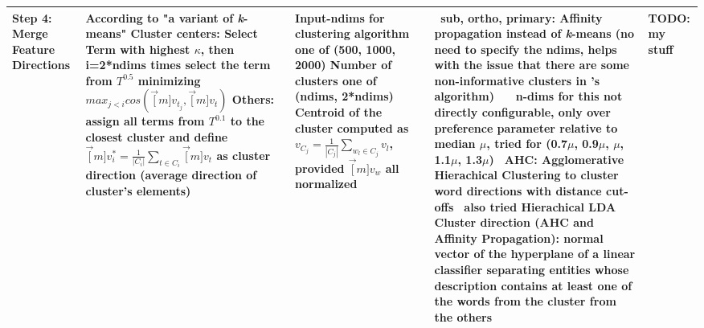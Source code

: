 \begin{landscape}
\begin{table}[]
{\begin{tabular}{lllll}
			\textbf{Step 4: Merge Feature Directions} 
			&   
			\specialcell[l]{ According to \cite{Alshaikh2020} "a variant of \textit{k}-means" \\ Cluster centers: Select Term with highest $\kappa$, then i=2*ndims times select the term from $T^{0.5}$ minimizing $max_{j<i}cos(\vec[m]{v_{t_j}},\vec[m]{v_t})$ \\ 
				Others: assign all terms from $T^{0.1}$ to the closest cluster and define $\vec[m]{v^*_i} = \frac{1}{|C_i|} \sum_{t\in C_i} \vec[m]{v_t}$ as cluster direction (average direction of cluster's elements)} 
			&
			\specialcell[l]{Input-ndims for clustering algorithm one of (500, 1000, 2000) \\
			Number of clusters one of (ndims, 2*ndims) \\
				Centroid of the cluster computed as $v_{C_j} = \frac{1}{|C_j|}\sum_{w_l \in C_j} v_l$, provided $\vec[m]{v_w}$ all normalized} 
			& 
			\specialcell[l]{  \textbullet\, \textbf{sub, ortho, primary}:   
				Affinity propagation instead of \textit{k}-means (no need to specify the ndims, helps with the issue that there are some non-informative clusters in \cite{Derrac2015}'s algorithm) \\ ~~ n-dims for this not directly configurable, only over preference parameter relative to median $\mu$, tried for (0.7$\mu$, 0.9$\mu$, $\mu$, 1.1$\mu$, 1.3$\mu$) \\  \textbullet\, \textbf{AHC}: Agglomerative Hierachical Clustering to cluster word directions with distance cut-offs  \\ \textbullet\, also tried Hierachical LDA \\ Cluster direction (AHC and Affinity Propagation): normal vector of the hyperplane of a linear classifier separating entities whose description contains at least one of the words from the cluster from the others  } %
			&
			TODO: my stuff
			\\  \midrule


\end{tabular}}
\end{table}
\end{landscape}
